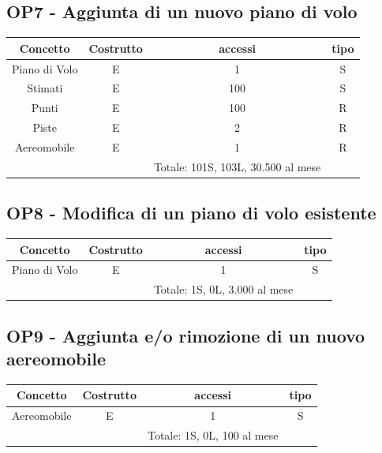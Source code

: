     \subsection*{OP7 - Aggiunta di un nuovo piano di volo}
    \begin{table}[H]
    \centering
    \begin{tabular}{|c|c|c|c|}
    \hline
    \rowcolor{green!70!black!80}
    \textbf{Concetto} & \textbf{Costrutto} & \textbf{accessi} & \textbf{tipo}\\
    \hline
    Piano di Volo & E & 1 & S \\
    Stimati & E & 100 & S \\
    Punti & E & 100 & R \\
    Piste & E & 2 & R \\
    Aereomobile & E & 1 & R \\
    & & Totale: 101S, 103L, 30.500 al mese &\\
    \hline
    \end{tabular}
    \end{table}
  
    \subsection*{OP8 - Modifica di un piano di volo esistente}
    \begin{table}[H]
    \centering
    \begin{tabular}{|c|c|c|c|}
    \hline
    \rowcolor{green!70!black!80}
    \textbf{Concetto} & \textbf{Costrutto} & \textbf{accessi} & \textbf{tipo}\\
    \hline
    Piano di Volo & E & 1 & S \\\
    & & Totale: 1S, 0L, 3.000 al mese &\\
    \hline
    \end{tabular}
    \end{table}

    \subsection*{OP9 - Aggiunta e/o rimozione di un nuovo aereomobile}
    \begin{table}[H]
    \centering
    \begin{tabular}{|c|c|c|c|}
    \hline
    \rowcolor{green!70!black!80}
    \textbf{Concetto} & \textbf{Costrutto} & \textbf{accessi} & \textbf{tipo}\\
    \hline
    Aereomobile & E & 1 & S \\\
    & & Totale: 1S, 0L, 100 al mese &\\
    \hline
    \end{tabular}
    \end{table}

